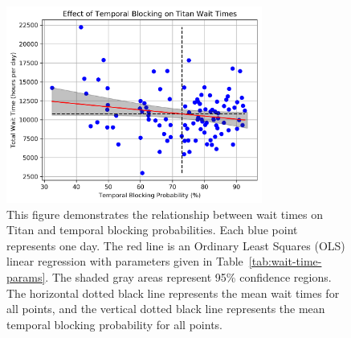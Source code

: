\begin{figure}
  \includegraphics[width=0.75\textwidth]{images/linfit-wait-time-vs-temporal-blocking-by-day.png}
\caption{This figure demonstrates the relationship between wait times on Titan
and temporal blocking probabilities. Each blue point represents one day. The
red line is an Ordinary Least Squares (OLS) linear regression with parameters
given in Table~\ref{tab:wait-time-params}. The shaded gray areas represent 95\%
confidence regions. The horizontal dotted black line represents the mean wait
times for all points, and the vertical dotted black line represents the mean
temporal blocking probability for all points.}
\label{fig:wait-time-temporal-all}
\end{figure}


